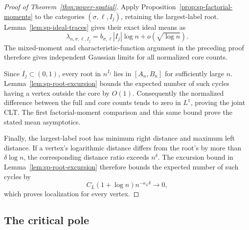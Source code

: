 \documentclass[11pt]{article}
\theoremstyle{remark}
\theoremstyle{plain}
\begin{document}
\begin{proof}[Proof of Theorem~\ref{thm:power-spatial}]
Apply Proposition~\ref{prop:sp-factorial-moments} to the categories
$(\sigma,\ell,I_j)$, retaining the largest-label root.
Lemma~\ref{lem:sp-ideal-traces} gives their exact ideal means as
\[
 \lambda_{n,\sigma,\ell,I_j}
 =b_{\sigma,\ell}|I_j|\log n+o(\sqrt{\log n}).
\]
The mixed-moment and characteristic-function argument in the preceding
proof therefore gives independent Gaussian limits for all normalized
core counts.

Since $\overline{I_j}\subset(0,1)$, every root in $n^{I_j}$ lies in
$[A_n,B_n]$ for sufficiently large $n$.
Lemma~\ref{lem:sp-root-excursion} bounds the expected number of such
cycles having a vertex outside the core by $O(1)$.  Consequently the
normalized difference between the full and core counts tends to zero
in $L^1$, proving the joint CLT.  The first factorial-moment comparison
and this same bound prove the stated mean asymptotics.

Finally, the largest-label root has minimum right distance and maximum
left distance.  If a vertex's logarithmic distance differs from the
root's by more than $\delta\log n$, the corresponding distance ratio
exceeds $n^\delta$.  The excursion bound in
Lemma~\ref{lem:sp-root-excursion} therefore bounds the expected number
of such cycles by
\[
 C_L(1+\log n)n^{-\kappa_L\delta}\longrightarrow0,
\]
which proves localization for every vertex.
\end{proof}


\subsection{The critical pole}
\end{document}
